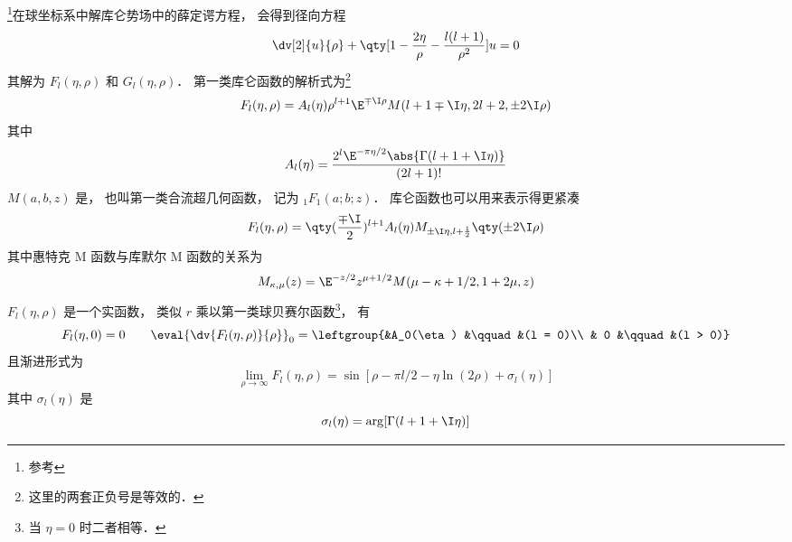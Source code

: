 

\footnote{参考 }在球坐标系中解库仑势场中的薛定谔方程， %
会得到径向方程
\begin{equation}
\dv[2]{u}{\rho} + \qty[1 - \frac{2\eta}{\rho} - \frac{l(l+1)}{\rho^2}]u = 0
\end{equation}
其解为 $F_l(\eta, \rho)$ 和 $G_l(\eta, \rho)$． 第一类库仑函数的解析式为\footnote{这里的两套正负号是等效的．}
\begin{equation}
F_l(\eta, \rho) = A_l(\eta) \rho^{l+1} \E^{\mp\I\rho} M(l+1\mp\I\eta, 2l+2, \pm 2\I\rho)
\end{equation}
其中
\begin{equation}
A_l(\eta) = \frac{2^l \E^{-\pi\eta/2} \abs{\Gamma(l+1+\I\eta)}}{(2l+1)!}
\end{equation}
$M(a, b, z)$ 是， 也叫第一类合流超几何函数， 记为 $_1 F_1(a;b;z)$． 库仑函数也可以用来表示得更紧凑
\begin{equation}
F_l(\eta, \rho) = \qty(\frac{\mp\I}{2})^{l+1} A_l(\eta) M_{\pm\I\eta, l+\frac12}\qty(\pm 2\I\rho)
\end{equation}
其中惠特克 M 函数与库默尔 M 函数的关系为
\begin{equation}
M_{\kappa, \mu}(z) = \E^{-z/2} z^{\mu + 1/2} M(\mu - \kappa + 1/2, 1 + 2\mu, z)
\end{equation}
$F_l(\eta, \rho)$ 是一个实函数， 类似 $r$ 乘以第一类球贝赛尔函数\footnote{当 $\eta = 0$ 时二者相等．}， 有
\begin{equation}
F_l(\eta, 0) = 0 \qquad \eval{\dv{F_l(\eta, \rho)}{\rho}}_0 = 
\leftgroup{&A_0(\eta) &\qquad &(l = 0)\\ & 0 &\qquad &(l > 0)}
\end{equation}
且渐进形式为
\begin{equation}\label{CulmF_eq7}
\lim_{\rho\to \infty} F_l(\eta, \rho) = \sin[\rho - \pi l/2 - \eta\ln(2\rho) + \sigma_l(\eta)]
\end{equation}
其中 $\sigma_l(\eta)$ 是
\begin{equation}\label{CulmF_eq8}
\sigma_l(\eta) = \arg[\Gamma(l+1+\I\eta)]
\end{equation}

